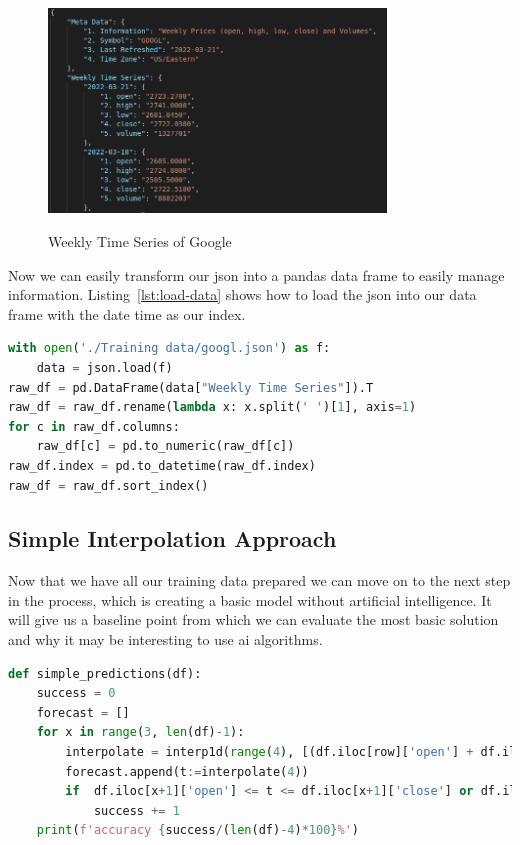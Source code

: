 \begin{figure}[H]
    \centering
    \caption{Weekly Time Series of Google}
    \includegraphics[width=0.8\textwidth]{figures/train data.png}
    \label{fig:training-data}
\end{figure}

Now we can easily transform our \gls{json} into a pandas data frame to easily manage information. Listing~\ref{lst:load-data} shows how to load the \gls{json} into our data frame with the date time as our index.

\begin{lstlisting}[language=python,caption=Load Data Into a Pandas Data Frame,label={lst:load-data}]
with open('./Training data/googl.json') as f:
    data = json.load(f)
raw_df = pd.DataFrame(data["Weekly Time Series"]).T
raw_df = raw_df.rename(lambda x: x.split(' ')[1], axis=1)
for c in raw_df.columns:
    raw_df[c] = pd.to_numeric(raw_df[c])
raw_df.index = pd.to_datetime(raw_df.index)
raw_df = raw_df.sort_index()
\end{lstlisting}

\subsection{Simple Interpolation Approach}

Now that we have all our training data prepared we can move on to the next step in the process, which is creating a basic model without artificial intelligence. It will give us a baseline point from which we can evaluate the most basic solution and why it may be interesting to use \gls{ai} algorithms.

\begin{lstlisting}[language=python,caption=Price Extrapolation,label={lst:base-model}]
def simple_predictions(df):
    success = 0
    forecast = []
    for x in range(3, len(df)-1):
        interpolate = interp1d(range(4), [(df.iloc[row]['open'] + df.iloc[row]['close']) / 2 for row in range(x-3, x+1)], kind='slinear', fill_value='extrapolate', bounds_error=False)
        forecast.append(t:=interpolate(4))
        if  df.iloc[x+1]['open'] <= t <= df.iloc[x+1]['close'] or df.iloc[x+1]['open'] >= t >= df.iloc[x+1]['close']:
            success += 1
    print(f'accuracy {success/(len(df)-4)*100}%')
\end{lstlisting}

